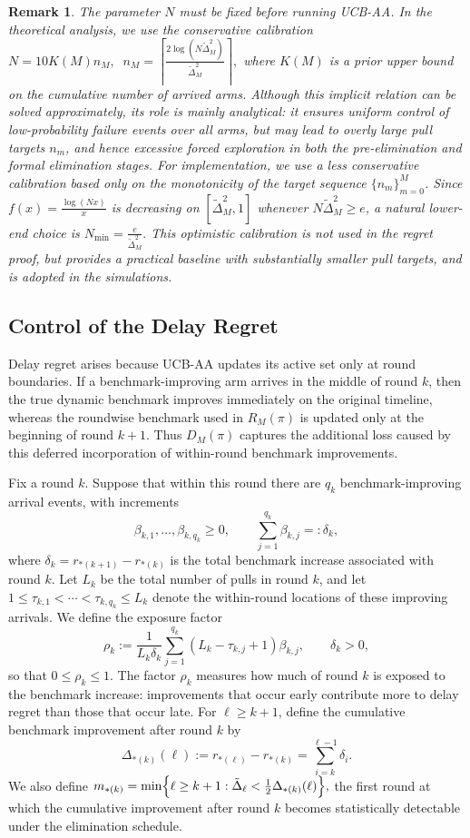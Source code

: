 \documentclass[11pt]{article}
\newtheorem{note}{Remark}
\begin{document}
\begin{note}
The parameter \(N\) must be fixed before running UCB-AA. In the theoretical analysis,
we use the conservative calibration
\(
N=10K(M)n_M, 
\;\;
n_M=\left\lceil 
\frac{2\log(N\widetilde\Delta_M^2)}{\widetilde\Delta_M^2}
\right\rceil ,
\)
where \(K(M)\) is a prior upper bound on the cumulative number of arrived arms. Although
this implicit relation can be solved approximately, its role is mainly analytical: it ensures
uniform control of low-probability failure events over all arms, but may lead to overly large
pull targets \(n_m\), and hence excessive forced exploration in both the pre-elimination and
formal elimination stages. For implementation, we use a less conservative calibration based only on the monotonicity
of the target sequence \(\{n_m\}_{m=0}^M\). Since
\(
f(x)=\frac{\log(Nx)}{x}
\)
is decreasing on \([\widetilde\Delta_M^2,1]\) whenever
\(N\widetilde\Delta_M^2\ge e\), a natural lower-end choice is
\(
N_{\min}=\frac{e}{\widetilde\Delta_M^2}.
\)
This optimistic calibration is not used in the regret proof, but provides a practical baseline
with substantially smaller pull targets, and is adopted in the simulations.

\end{note}

\subsection{Control of the Delay Regret}

Delay regret arises because UCB-AA updates its active set only at round boundaries. If a
benchmark-improving arm arrives in the middle of round \(k\), then the true dynamic
benchmark improves immediately on the original timeline, whereas the roundwise benchmark
used in \(R_M(\pi)\) is updated only at the beginning of round \(k+1\). Thus \(D_M(\pi)\)
captures the additional loss caused by this deferred incorporation of within-round benchmark
improvements.

Fix a round \(k\). Suppose that within this round there are \(q_k\) benchmark-improving
arrival events, with increments
\[
\beta_{k,1},\dots,\beta_{k,q_k}\ge 0,
\qquad 
\sum_{j=1}^{q_k}\beta_{k,j}=: \delta_k,
\]
where
\(
\delta_k=r_{*(k+1)}-r_{*(k)}
\)
is the total benchmark increase associated with round \(k\). Let \(L_k\) be the total number
of pulls in round \(k\), and let
\(
1\le \tau_{k,1}<\cdots<\tau_{k,q_k}\le L_k
\)
denote the within-round locations of these improving arrivals. We define the exposure factor
\[
\rho_k:=
\frac{1}{L_k\delta_k}
\sum_{j=1}^{q_k}(L_k-\tau_{k,j}+1)\beta_{k,j},
\qquad \delta_k>0,
\]
so that \(0\le \rho_k\le 1\). The factor \(\rho_k\) measures how much of round \(k\) is exposed
to the benchmark increase: improvements that occur early contribute more to delay regret than
those that occur late.
For \(\ell\ge k+1\), define the cumulative benchmark improvement after round \(k\) by
\[
\Delta_{*(k)}(\ell):=r_{*(\ell)}-r_{*(k)}=\sum_{i=k}^{\ell-1}\delta_i.
\]
We also define
\(
m_{*(k)}=\min\Bigl\{\ell\ge k+1:\tilde\Delta_\ell<\tfrac12\Delta_{*(k)}(\ell)\Bigr\},
\)
the first round at which the cumulative improvement after round \(k\) becomes statistically
detectable under the elimination schedule.
\end{document}

